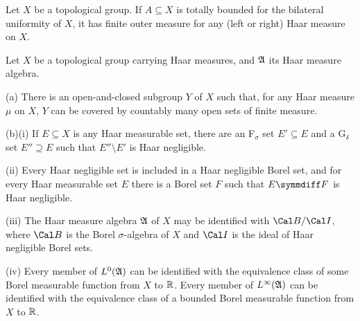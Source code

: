 Let $X$ be a topological group.   If $A\subseteq X$
is totally bounded for the bilateral
uniformity of $X$, it has finite outer measure for any (left or right)
Haar measure on $X$.


Let $X$ be a topological group carrying Haar measures, and $\frak A$ its
Haar measure algebra.

(a) There is an open-and-closed subgroup $Y$ of $X$ such that, for any
Haar measure $\mu$ on $X$, $Y$ can be covered by countably many open
sets of finite measure.

(b)(i) If $E\subseteq X$ is any Haar measurable set, there are an
F$_{\sigma}$ set $E'\subseteq E$ and a G$_{\delta}$ set $E''\supseteq E$
such that $E''\setminus E'$ is Haar negligible.

\quad(ii) Every Haar negligible set is included in a Haar negligible
Borel set, and for every Haar measurable set $E$ there is a Borel set
$F$ such that $E\symmdiff F$ is Haar negligible.

\quad(iii) The Haar measure algebra $\frak A$ of $X$ may be identified
with $\Cal B/\Cal I$, where $\Cal B$ is the Borel $\sigma$-algebra of
$X$ and
$\Cal I$ is the ideal of Haar negligible Borel sets.

\quad(iv) Every member of $L^0(\frak A)$ can be identified with the
equivalence class of some Borel measurable function from $X$ to
$\Bbb R$.
Every member of $L^{\infty}(\frak A)$ can be identified with the
equivalence class of a bounded Borel measurable function from $X$ to
$\Bbb R$.

